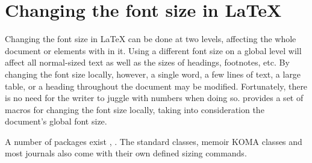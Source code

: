 \normalfont

\section{Changing the font size in LaTeX}


Changing the font size in LaTeX can be done at two levels, 
affecting the whole document or elements with in it. 
Using a different font size on a
global level will affect all normal-sized text as well
as the sizes of headings, footnotes, etc. By changing
the font size locally, however, a single word, a few
lines of text, a large table, or a heading throughout
the document may be modified. Fortunately, there is
no need for the writer to juggle with numbers when
doing so. \latex provides a set of macros for changing
the font size locally, taking into consideration the
document’s global font size. \citep{thurnherr2012}

A number of packages exist  \citep{moresize},
  \citep{anyfont}. The standard classes, memoir
 KOMA classes and most journals also come with their own
 defined sizing commands.
 
 
















